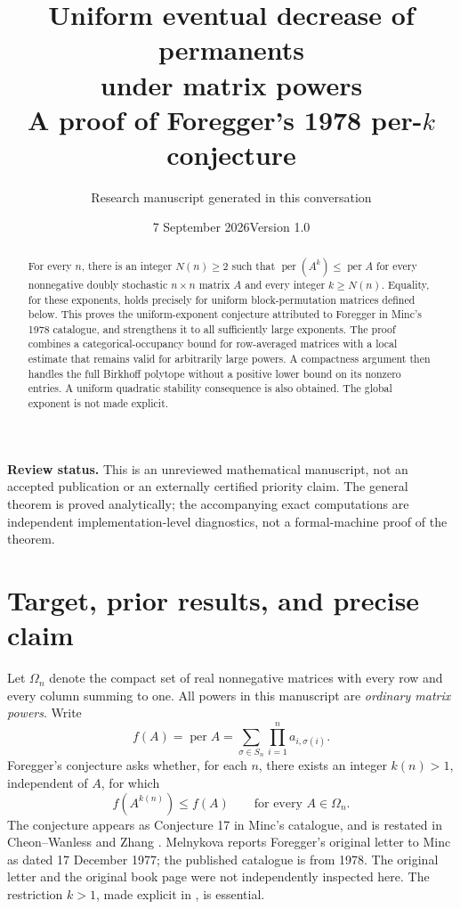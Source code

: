 \documentclass[11pt]{article}
\title{Uniform eventual decrease of permanents\\
under matrix powers\\[5pt]\large A proof of Foregger's 1978 per-$k$ conjecture}
\author{Research manuscript generated in this conversation}
\date{7 September 2026\quad Version 1.0}
\theoremstyle{remark}\newtheorem{remark}[theorem]{Remark}
\DeclareMathOperator{\per}{per}
\newcommand{\Om}{\Omega_n}
\begin{document}
\maketitle
\begin{abstract}
For every $n$, there is an integer $N(n)\ge2$ such that
$\per(A^k)\le\per A$ for every nonnegative doubly stochastic $n\times n$
matrix $A$ and every integer $k\ge N(n)$. Equality, for these exponents,
holds precisely for uniform block-permutation matrices defined below.
This proves the uniform-exponent conjecture attributed to Foregger in
Minc's 1978 catalogue, and strengthens it to all sufficiently large
exponents. The proof combines a categorical-occupancy bound for
row-averaged matrices with a local estimate that remains valid for
arbitrarily large powers. A compactness argument then handles the full
Birkhoff polytope without a positive lower bound on its nonzero entries.
A uniform quadratic stability consequence is also obtained.
The global exponent is not made explicit.
\end{abstract}
\begin{center}\small
\textbf{Review status.} This is an unreviewed mathematical manuscript, not
an accepted publication or an externally certified priority claim.
The general theorem is proved analytically; the accompanying exact
computations are independent implementation-level diagnostics, not a
formal-machine proof of the theorem.
\end{center}

\section{Target, prior results, and precise claim}
Let $\Om$ denote the compact set of real nonnegative matrices with every
row and every column summing to one. All powers in this manuscript are
\emph{ordinary matrix powers}. Write
\[
 f(A)=\per A=\sum_{\sigma\in S_n}\prod_{i=1}^n a_{i,\sigma(i)}.
\]
Foregger's conjecture asks whether, for each $n$, there exists an integer
$k(n)>1$, independent of $A$, for which
\begin{equation}\label{eq:conjecture}
 f(A^{k(n)})\le f(A)\qquad\text{for every }A\in\Om.
\end{equation}
The conjecture appears as Conjecture 17 in Minc's catalogue, and is
restated in Cheon--Wanless \cite{CW} and Zhang \cite{Zhang}. Melnykova
\cite[Section 4.1]{Mel} reports Foregger's original letter to Minc as
dated 17 December 1977; the published catalogue is from 1978. The original
letter and the original book page were not independently inspected here.
The restriction $k>1$, made explicit in \cite{Mel}, is essential.
\end{document}
